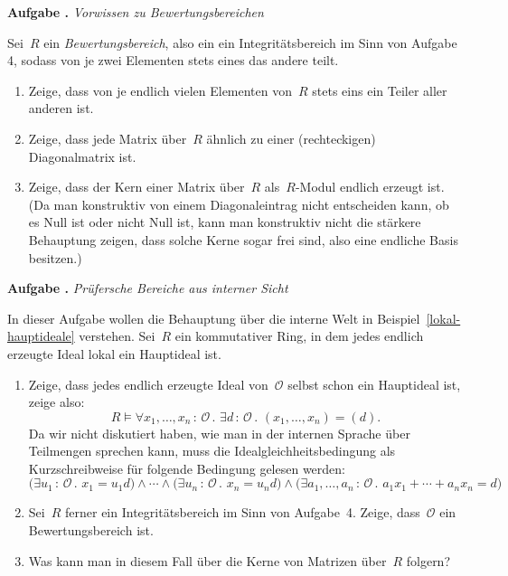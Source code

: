 \documentclass[a4paper,ngerman,12pt]{scrartcl}
\theoremstyle{definition}
\theoremstyle{plain}
\theoremstyle{remark}
\renewcommand{\O}{\mathcal{O}}
\renewcommand{\_}{\mathpunct{.}\,}
\newcommand{\?}{\,{:}\,}
\newlength{\aufgabenskip}
\newcounter{aufgabennummer}
\newenvironment{aufgabe}[1]{
  \addtocounter{aufgabennummer}{1}
  \textbf{Aufgabe \theaufgabennummer{}.} \emph{#1} \par
}{\vspace{\aufgabenskip}}
\begin{document}
\begin{aufgabe}{Vorwissen zu Bewertungsbereichen}
Sei~$R$ ein \emph{Bewertungsbereich}, also ein
ein Integritätsbereich im Sinn von Aufgabe 4, sodass von je zwei Elementen
stets eines das andere teilt.
\begin{enumerate}
\item Zeige, dass von je endlich vielen Elementen von~$R$ stets
eins ein Teiler aller anderen ist.
\item Zeige, dass jede Matrix über~$R$ ähnlich zu einer
(rechteckigen) Diagonalmatrix ist.
\item Zeige, dass der Kern einer Matrix über~$R$ als~$R$-Modul endlich erzeugt ist.
(Da man konstruktiv von einem Diagonaleintrag nicht entscheiden kann, ob es
Null ist oder nicht Null ist, kann man konstruktiv nicht die stärkere
Behauptung zeigen, dass solche Kerne sogar frei sind, also eine endliche Basis
besitzen.)
\end{enumerate}
\end{aufgabe}

\begin{aufgabe}{Prüfersche Bereiche aus interner Sicht}
In dieser Aufgabe wollen die Behauptung über die interne Welt in
Beispiel~\ref{lokal-hauptideale} verstehen.
Sei~$R$ ein kommutativer Ring, in dem jedes
endlich erzeugte Ideal lokal ein Hauptideal ist.
\begin{enumerate}
\item Zeige, dass jedes endlich
erzeugte Ideal von~$\O$ selbst schon ein Hauptideal ist, zeige also:
\[ R \models
  \forall x_1,\ldots,x_n\?\O\_
  \exists d\?\O\_
  (x_1,\ldots,x_n) = (d). \]
Da wir nicht diskutiert haben, wie man in der internen Sprache über Teilmengen
sprechen kann, muss die Idealgleichheitsbedingung als Kurzschreibweise für
folgende Bedingung gelesen werden:
\[
  \bigl(\exists u_1\?\O\_ x_1 = u_1 d\bigr) \wedge
  \cdots \wedge
  \bigl(\exists u_n\?\O\_ x_n = u_n d\bigr) \wedge
  \bigl(\exists a_1,\ldots,a_n\?\O\_ a_1 x_1 + \cdots + a_n x_n = d\bigr)
\]
\item Sei~$R$ ferner ein Integritätsbereich im Sinn von Aufgabe~4. Zeige,
dass~$\O$ ein Bewertungsbereich ist.
\item Was kann man in diesem Fall über die Kerne von Matrizen über~$R$ folgern?
\end{enumerate}
\end{aufgabe}
\end{document}
